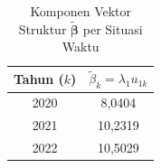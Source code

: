 \begin{table}[H]
\centering
\small
\caption{Komponen Vektor Struktur $\tilde{\boldsymbol{\beta}}$ per Situasi Waktu} \label{tab:sample2beta_vec}
\begin{tabular}{|c|c|}
\hline
\textbf{Tahun ($k$)} & \textbf{$\tilde{\beta}_k = \lambda_1 u_{1k}$} \\
\hline
2020 & 8,0404 \\
2021 & 10,2319 \\
2022 & 10,5029 \\
\hline
\end{tabular}
\end{table}